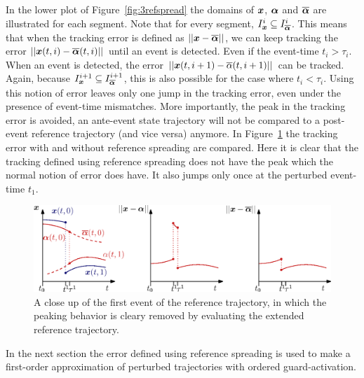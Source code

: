 \documentclass[../DC2017114Bouma.tex]{subfiles}
\begin{document}
In the lower plot of Figure~\ref{fig:3refspread} the domains of ${\boldsymbol{x}}$, $\boldsymbol{\alpha}$ and $\overline{\boldsymbol{\alpha}}$ are illustrated for each segment. Note that for every segment, $I_{{\boldsymbol{x}}}^i\subseteq I_{\overline{\boldsymbol{\alpha}}}^i$. This means that when the tracking error is defined as $||{\boldsymbol{x}}-\overline{\boldsymbol{\alpha}}||$, we can keep tracking the error $||{\boldsymbol{x}}(t,i)-\overline{\boldsymbol{\alpha}}(t,i)||$ until an event is detected. Even if the event-time $t_i>\tau_i$. When an event is detected, the error  $||{\boldsymbol{x}}(t,i+1)-\overline{\alpha}(t,i+1)||$ can be tracked. Again, because $I_{{\boldsymbol{x}}}^{i+1}\subseteq I_{\overline{\boldsymbol{\alpha}}}^{i+1}$, this is also possible for the case where $t_i<\tau_i$. Using this notion of error leaves only one jump in the tracking error, even under the presence of event-time mismatches. More importantly, the peak in the tracking error is avoided, an ante-event state trajectory will not be compared to a post-event reference trajectory (and vice versa) anymore. In Figure~\ref{fig:3refspreaderrors} the tracking error with and without reference spreading are compared. Here it is clear that the tracking defined using reference spreading does not have the peak which the normal notion of error does have. It also jumps only once at the perturbed event-time $t_1$.
\begin{figure}[h]
\centering
\includegraphics[width=\textwidth]{refspreaderrors.eps}\caption{A close up of the  first event of the reference trajectory, in which the peaking behavior is cleary removed by evaluating the extended reference trajectory.} \label{fig:3refspreaderrors}
\end{figure}

In the next section the error defined using reference spreading is used to make a first-order approximation of perturbed trajectories with ordered guard-activation.
\end{document}
